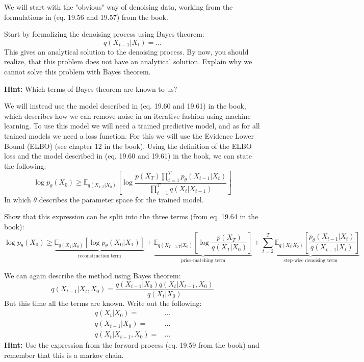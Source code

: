 \documentclass[12pt]{article}    %
\begin{document}

\exminor
We will start with the "obvious" way of denoising data, working from the formulations in (eq. 19.56 and 19.57) from the book.

Start by formalizing the denoising process using Bayes theorem:
\begin{equation}
  q(X_{t-1}|X_t) = \dots
\end{equation}
This gives an analytical solution to the denoising process. 
By now, you should realize, that this problem does not have an analytical solution.
Explain why we cannot solve this problem with Bayes theorem.

\textbf{Hint:} Which terms of Bayes theorem are known to us?

\exminor
We will instead use the model described in (eq. 19.60 and 19.61) in the book, 
which describes how we can remove noise in an iterative fashion using machine learning.
To use this model we will need a trained predictive model, and as for all trained models we need a loss function. 
For this we will use the Evidence Lower Bound (ELBO) (see chapter 12 in the book).
Using the definition of the ELBO loss and the model described in (eq. 19.60 and 19.61) in the book, we can state the following:
\begin{equation}
    \log p_{\theta}(X_0) \geq \mathbb{E}_{q(X_{1:T}|X_0)}\left[ \log \frac{p(X_T) \prod_{t=1}^{T} p_{\theta}(X_{t-1}|X_t)}{\prod_{t=1}^{T} q(X_t|X_{t-1})} \right]
\end{equation}
In which $\theta$ describes the parameter space for the trained model.

Show that this expression can be split into the three terms (from eq. 19.64 in the book):
\begin{equation}
    \log p_{\theta}(X_0) \geq \underbrace{\mathbb{E}_{q(X_{1}|X_0)} [\log p_{\theta}(X_0|X_1)]}_{\text{reconstruction term}} +\underbrace{\mathbb{E}_{q(X_{T-1:T}|X_0)} \left[ \log \frac{p(X_T)}{q(X_T|X_{0})} \right]}_{\text{prior-matching term}} + \underbrace{\sum_{t=2}^{T}\mathbb{E}_{q(X_{t}|X_0)}\left[\frac{p_{\theta}(X_{t-1}|X_{t})}{q(X_{t-1}|X_{t})} \right]}_{\text{step-wise denoising term}}
\end{equation}

\exminor
We can again describe the method using Bayes theorem:
\begin{equation} \label{eq:bayes-diffusion-denoising}
    q(X_{t-1}|X_{t}, X_0) = \frac{q(X_{t-1}|X_0)q(X_t|X_{t-1},X_0)}{q(X_t|X_0)}
\end{equation} 
But this time all the terms are known. Write out the following:
\begin{align}
    q(X_t|X_0) =& \dots \\
    q(X_{t-1}|X_0) =& \dots \\
    q(X_t|X_{t-1},X_0) =& \dots
\end{align}
\textbf{Hint:} Use the expression from the forward process (eq. 19.59 from the book) and remember that this is a markov chain.
\end{document}
